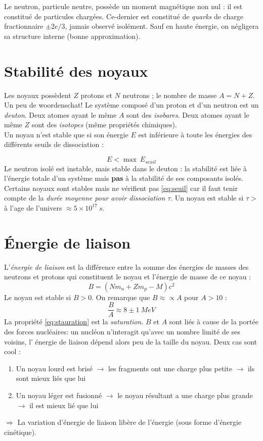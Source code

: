 \documentclass[british,french,11pt, a4paper, openany]{book}
\begin{document}
Le neutron, particule neutre, possède un moment magnétique non nul : il est constitué de particules
chargées. Ce-dernier est constitué de \textit{quarks} de charge fractionnaire $\pm 2e/3$, jamais 
observé isolément. Sauf en haute énergie, on négligera sa structure interne (bonne approximation).

\section{Stabilité des noyaux}
Les noyaux possèdent $Z$ protons et $N$ neutrons ; le nombre de masse $A = N + Z$. Un peu de 
woordenschat! Le système composé d'un proton et d'un neutron est un \textit{deuton}. Deux atomes ayant le même 
$A$ sont des \textit{isobares}. Deux atomes ayant le même $Z$ sont des \textit{isotopes} (même 
propriétés chimiques).\\
Un noyau n'est stable que si son énergie $E$ est inférieure à toute les énergies des différents 
seuils de dissociation : 

\begin{equation}
	E < \max\ E_{seuil}
	\label{eq:seuil}
\end{equation}
Le neutron isolé est instable, mais stable dans le deuton : la stabilité est liée à l'énergie 
totale d'un système mais \textbf{pas} à la stabilité de ses composants isolés. \\
Certains noyaux sont stables mais ne vérifient pas \autoref{eq:seuil} car il faut tenir compte 
de la \textit{durée moyenne pour avoir dissociation} $\tau$. Un noyau est stable si $\tau >$ à
l'age de l'univers $\approx 5\times10^{17}\ s$.


\section{Énergie de liaison}
L'\textit{énergie de liaison} est la différence entre la somme des énergies de masses des neutrons 
et protons qui constituent le noyau et l'énergie de masse de ce noyau : 
\begin{equation}
	B = (Nm_n + Zm_p - M)c^2
\end{equation}
Le noyau est stable si $B>0$. On remarque que $B \approx\propto A$ pour $A>10$ :
\begin{equation}
	\frac{B}{A} \approx 8 \pm 1\ MeV
	\label{eq:stauration}
\end{equation}
La propriété \autoref{eq:stauration} est la \textit{saturation}. $B$ et $A$ sont liés à cause de la 
portée des forces nucléaires: un nucléon n’interagit qu'avec un nombre limité de ses voisins, l'
énergie de liaison dépend alors peu de la taille du noyau. Deux cas sont cool :
\begin{enumerate}
	\item Un noyau lourd est brisé $\rightarrow$ les fragments ont une charge plus petite $\rightarrow$ ils
	sont mieux liés que lui
	\item Un noyau léger est fusionné $\rightarrow$ le noyau résultant a une charge plus grande$\rightarrow$
	il est mieux lié que lui
\end{enumerate}
$\Rightarrow$ La variation d'énergie de liaison libère de l'énergie (sous forme d'énergie cinétique).
\end{document}
